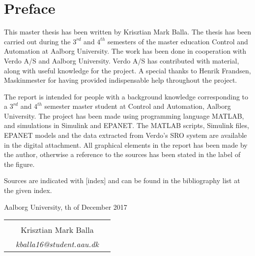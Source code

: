 \chapter*{Preface}

This master thesis has been written by Krisztian Mark Balla. The thesis has been carried out during the $3^{rd}$ and $4^{th}$ semesters of the master education Control and Automation at Aalborg University. The work has been done in cooperation with Verdo A/S and Aalborg University. Verdo A/S has contributed with material, along with useful knowledge for the project. A special thanks to Henrik Frandsen, Maskinmester for having provided indispensable help throughout the project. 

The report is intended for people with a background knowledge corresponding to a $3^{rd}$ and $4^{th}$ semester master student at Control and Automation, Aalborg University. The project has been made using programming language MATLAB, and simulations in Simulink and EPANET. The MATLAB scripts, Simulink files, EPANET models and the data extracted from Verdo's SRO system are available in the digital attachment. All graphical elements in the report has been made by the author, otherwise a reference to the sources has been stated in the label of the figure. 

Sources are indicated with [index] and can be found in the bibliography list at the given index. 

\hfill Aalborg University, th of December 2017




\vfill

\begin{table}[H]
	\centering
		\begin{tabular}{c c c}
			& \underline{\phantom{mmmmmmmmmmmmmmmmmmm}} 	& \\
			& Krisztian Mark Balla					& \\
			& \textit{kballa16@student.aau.dk}		& \\
		\end{tabular}
\end{table}